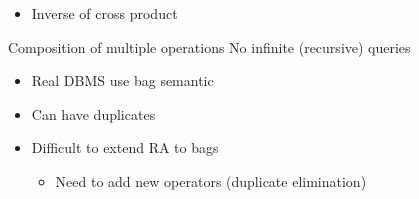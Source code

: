 \begin{itemize}
\begin{itemize}
\begin{itemize}
                    \item Inverse of cross product
                \end{itemize}
        \end{itemize}
     Composition of multiple operations
    \icon No infinite (recursive) queries
        \begin{itemize}
            \item Real DBMS use bag semantic
            \item Can have duplicates
            \item Difficult to extend RA to bags
                \begin{itemize}
                    \item Need to add new operators (duplicate elimination)
                \end{itemize}
        \end{itemize}
\end{itemize}

